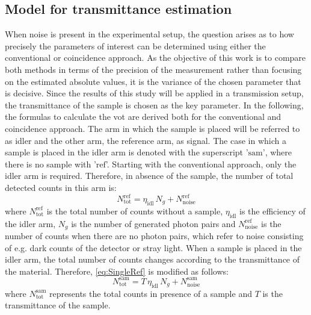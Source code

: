 \subsection{Model for transmittance estimation}
When noise is present in the experimental setup, the question arises as to how precisely the parameters of interest can be determined using either the conventional or coincidence approach. As the objective of this work is to compare both methods in terms of the precision of the measurement rather than focusing on the estimated absolute values, it is the variance of the chosen parameter that is decisive. Since the results of this study will be applied in a transmission setup, the transmittance of the sample is chosen as the key parameter. \newline
In the following, the formulas to calculate the \acrfull{vot} are derived both for the conventional and coincidence approach. The arm in which the sample is placed will be referred to as idler and the other arm, the reference arm, as signal. The case in which a sample is placed in the idler arm is denoted with the superscript '$\text{sam}$', where there is no sample with '$\text{ref}$'. \newline
Starting with the conventional approach, only the idler arm is required. Therefore, in absence of the sample, the number of total detected counts in this arm is: 
\begin{equation}
	N_{\text{tot}}^{\text{ref}} = \eta_{\text{idl}} \, N_g + N_{\text{noise}}^{\text{ref}}
	\label{eq:SingleRef}
\end{equation}
where $N_{\text{tot}}^{\text{ref}}$ is the total number of counts without a sample, $\eta_{\text{idl}}$ is the efficiency of the idler arm, $N_g$ is the number of generated photon pairs and $N_{\text{noise}}^{\text{ref}}$ is the number of counts when there are no photon pairs, which refer to noise consisting of e.g. dark counts of the detector or stray light. \newline
When a sample is placed in the idler arm, the total number of counts changes according to the transmittance of the material. Therefore, \autoref{eq:SingleRef} is modified as follows:
\begin{equation}
	N_{\text{tot}}^{\text{sam}} = T \, \eta_{\text{idl}} \, N_g + N_{\text{noise}}^{\text{sam}}
	\label{eq:SingleSam}
\end{equation}
where $N_{\text{tot}}^{\text{sam}}$ represents the total counts in presence of a sample and $T$ is the transmittance of the sample. \newline
